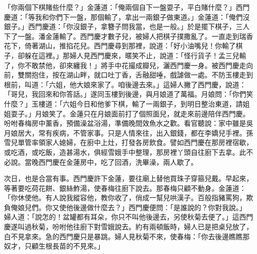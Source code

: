 「你兩個下棋賭些什麼？」金蓮道：「俺兩個自下一盤耍子，平白賭什麼？」西門慶道：「等我和你們下一盤，那個輸了，拿出一兩銀子做東道。」金蓮道：「俺們沒銀子。」西門慶道：「你沒銀子，拿簪子問我當，也是一般。」於是擺下棋子，三人下了一盤。潘金蓮輸了。西門慶才數子兒，被婦人把棋子撲撒亂了。一直走到瑞香花下，倚著湖山，推掐花兒。西門慶尋到那裡，說道：「好小油嘴兒！你輸了棋子，卻躲在這裡。」那婦人見西門慶來，暱笑不止，說道：「怪行貨子！孟三兒輸了，你不敢禁他，卻來纏我！」將手中花撮成瓣兒，灑西門慶一身。被西門慶走向前，雙關抱住，按在湖山畔，就口吐丁香，舌融甜唾，戲謔做一處。不防玉樓走到根前，叫道：「六姐，他大娘來家了。咱後邊去來。」這婦人撇了西門慶，說道：「哥兒，我回來和你答話。」遂同玉樓到後邊，與月娘道了萬福。月娘問：「你們笑什麼？」玉樓道：「六姐今日和他爹下棋，輸了一兩銀子，到明日整治東道，請姐姐耍子。」月娘笑了。金蓮只在月娘面前打了個照面兒，就走來前邊陪伴西門慶。吩咐春梅房中薰香，預備澡盆浴湯，準備晚間效魚水之歡。看官聽說：家中雖是吳月娘居大，常有疾病，不管家事。只是人情來往，出入銀錢，都在李嬌兒手裡。孫雪兒單管率領家人媳婦，在廚中上灶，打發各房飲食。譬如西門慶在那房裡宿歇，或吃酒，或吃飯，造甚湯水，俱經雪娥手中整理，那房裡丫頭自往廚下去拿。此不必說。當晚西門慶在金蓮房中，吃了回酒，洗畢澡，兩人歇了。

次日，也是合當有事。西門慶許下金蓮，要往廟上替他買珠子穿箍兒戴。早起來，等著要吃荷花餅、銀絲鮓湯，使春梅往廚下說去。那春梅只顧不動身。金蓮道： 「你休使他。有人說我縱容他，教你收了，俏成一幫兒哄漢子。百般指豬罵狗，欺負俺娘兒們。你又使他後邊做什麼去？」西門慶便問：「是誰說的？你對我說。」 婦人道：「說怎的！盆罐都有耳朵，你只不叫他後邊去，另使秋菊去便了。」這西門慶遂叫過秋菊，吩咐他往廚下對雪娥說去。約有兩頓飯時，婦人已是把桌兒放了，白不見拿來。急的西門慶只是暴跳。婦人見秋菊不來，使春梅：「你去後邊瞧瞧那奴才，只顧生根長苗的不見來。」

